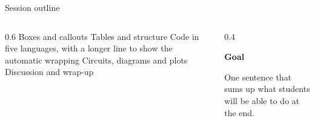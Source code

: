 \documentclass[aspectratio=169,12pt,t]{beamer}
\begin{document}

\begin{frame}{Session outline}
  \begin{columns}[T,onlytextwidth]
    \begin{column}{0.6\textwidth}
      Boxes and callouts\estep
      Tables and structure\estep
      Code in five languages, with a longer line to show the automatic wrapping\estep
      Circuits, diagrams and plots\estep
      Discussion and wrap-up\estep
    \end{column}
    \begin{column}{0.4\textwidth}
      \begin{card}
        {\bfseries\color{accent}Goal}\par\smallskip
        One sentence that sums up what students will be able to do at the end.
      \end{card}
    \end{column}
  \end{columns}
\end{frame}
\end{document}
